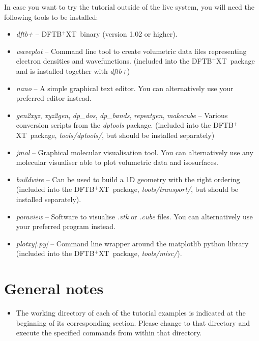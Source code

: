 \documentclass[a4paper,11pt,english]{sphinxmanual}
\newcommand{\dftbpxt}{\textsf{DFTB$^{\text{+}}$XT\ }} %
\begin{document}
{{In case you want to try the tutorial outside of the live system, you
will need the following tools to be installed:

\begin{itemize}
  
\item {} 
\emph{dftb+} -- \dftbpxt binary (version 1.02 or higher).

\item {} 
\emph{waveplot} -- Command line tool to create volumetric data files
representing electron densities and wavefunctions. (included into the \dftbpxt package and is installed together with \emph{dftb+}) 

\item {} 
\emph{nano} -- A simple graphical text editor. You can alternatively
use your preferred editor instead.

\item {} 
\emph{gen2xyz}, \emph{xyz2gen}, \emph{dp\_dos}, \emph{dp\_bands}, \emph{repeatgen}, \emph{makecube} -- Various conversion scripts from
the \emph{dptools} package. (included into the \dftbpxt package, \emph{tools/dptools/}, but should be installed separately)

\item {} 
\emph{jmol} -- Graphical molecular visualisation tool. You can
alternatively use any molecular visualiser able to plot volumetric
data and isosurfaces.

\item {} 
\emph{buildwire} -- Can be used to build a 1D geometry with the right ordering (included into the \dftbpxt package, \emph{tools/transport/}, but should be installed separately).

\item {} 
\emph{paraview} -- Software to visualise \emph{.vtk} or \emph{.cube} files. You can alternatively use your preferred program instead.

\item {} 
\emph{plotxy[.py]} -- Command line wrapper around the matplotlib python library (included into the \dftbpxt package, \emph{tools/misc/}).  

\end{itemize}


\section{General notes}
\label{introduction:general-notes}\begin{itemize}
\item {} 
The working directory of each of the tutorial examples is indicated
at the beginning of its corresponding section. Please change to that
directory and execute the specified commands from within that
directory.


\end{itemize}}}
\end{document}
